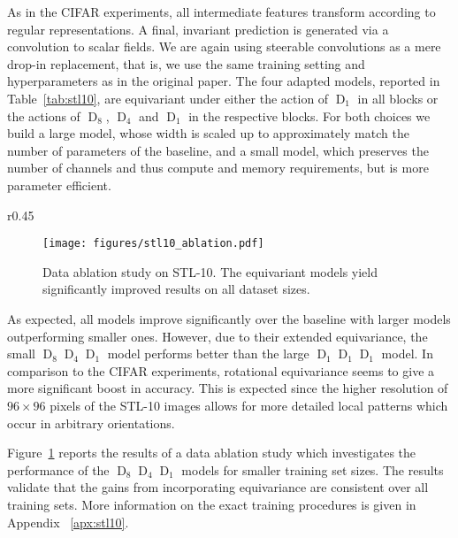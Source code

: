 \documentclass{article}
\newcommand{\apx}{Appendix\xspace
}
\newcommand{\D}[1]{\ensuremath{\operatorname{D}_{#1}}}
\begin{document}
As in the CIFAR experiments, all intermediate features transform according to regular representations.
A final, invariant prediction is generated via a convolution to scalar fields.
We are again using steerable convolutions as a mere drop-in replacement, that is, we use the same training setting and hyperparameters as in the original paper.
The four adapted models, reported in Table~\ref{tab:stl10}, are equivariant under either the action of $\D1$ in all blocks or the actions of $\D8$, $\D4$ and $\D1$ in the respective blocks.
For both choices we build a large model, whose width is scaled up to approximately match the number of parameters of the baseline, and a small model, which preserves the number of channels and thus compute and memory requirements, but is more parameter efficient.
\begin{wrapfigure}{r}{0.45\textwidth}
\vspace*{-4.8ex}
\begin{minipage}{\linewidth}
    \begin{figure}[H]
        \centering
        \texttt{[image: figures/stl10\_ablation.pdf]}
        \begin{minipage}{.9\linewidth}
            \vspace*{2pt}
            \caption{
                Data ablation study on STL-10.
                The equivariant models yield significantly improved results on all dataset sizes.
            }
            \label{fig:stl10_ablation}
        \end{minipage}
    \end{figure}
\end{minipage}
\end{wrapfigure}

\vspace*{-1.2ex}
As expected, all models improve significantly over the baseline with larger models outperforming smaller ones.
However, due to their extended equivariance, the small $\D8\D4\D1$ model performs better than the large $\D1\D1\D1$ model.
In comparison to the CIFAR experiments, rotational equivariance seems to give a more significant boost in accuracy.
This is expected since the higher resolution of $96\times96$ pixels of the STL-10 images allows for more detailed local patterns which occur in arbitrary orientations.

Figure~\ref{fig:stl10_ablation} reports the results of a data ablation study which investigates the performance of the $\D8\D4\D1$ models for smaller training set sizes.
The results validate that the gains from incorporating equivariance are consistent over all training sets.
More information on the exact training procedures is given in \apx~\ref{apx:stl10}.
\end{document}
